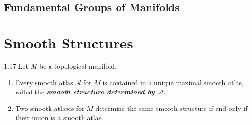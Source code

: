 \subsection{Fundamental Groups of Manifolds}

\section{Smooth Structures}

\begin{prop}{1.17}
    Let \( M \) be a topological manifold.
    \begin{enumerate}[itemsep=0pt,label={(\alph*)}]
        \item Every smooth atlas \( \mathcal{A} \) for \( M \) is contained in a unique maximal smooth atlas, called the \textbf{\emph{smooth structure determined by \( \boldsymbol{\mathcal{A}} \)}}.
        \item Two smooth atlases for \( M \) determine the same smooth structure if and only if their union is a smooth atlas.
    \end{enumerate}
\end{prop}

